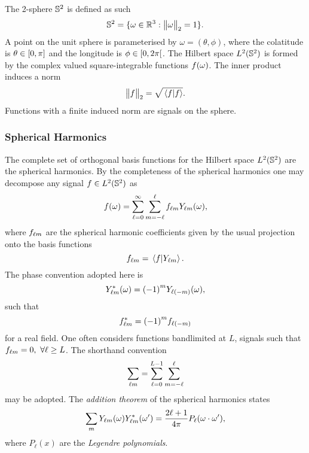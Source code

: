 The 2-sphere \(\twoSphere{}\) is defined as such
%
\begin{equation}
	\twoSphere{} = \set{\omega \in \mathbb{R}^{3} : \norm{\omega} = 1}.
\end{equation}
%
A point on the unit sphere is parameterised by \(\omega=(\theta,\phi)\), where the colatitude is \(\theta \in \interval{0}{\pi}\) and the longitude is \(\phi \in \interval[open right]{0}{2\pi}\).
The Hilbert space \(\hilbert{\twoSphere}\) is formed by the complex valued square-integrable functions \(\pixel{f}\).
The inner product induces a norm
%
\begin{equation}
	\norm{f} = \sqrt{\braket*{f}}.
\end{equation}
%
Functions with a finite induced norm are signals on the sphere.

\subsubsection{Spherical Harmonics}

The complete set of orthogonal basis functions for the Hilbert space \(\hilbert{\twoSphere}\) are the spherical harmonics.
By the completeness of the spherical harmonics one may decompose any signal \(f \in \hilbert{\twoSphere}\) as
%
\begin{equation}
	\pixel{f}
	= \sum\limits_{\ell=0}^{\infty} \sum\limits_{m=-\ell}^{\ell} \harmonic{f} \pixel{\harmonic{Y}},
\end{equation}
%
where \(\harmonic{f}\) are the spherical harmonic coefficients given by the usual projection onto the basis functions
%
\begin{equation}
	\harmonic{f}
	= \braket*{f}{\harmonic{Y}}.
\end{equation}
%
The phase convention adopted here is
%
\begin{equation}
	\pixel{\conj{\harmonic{Y}}}
	= {(-1)}^{m} \pixel{Y_{\ell(-m)}},
\end{equation}
%
such that
%
\begin{equation}
	\conj{\harmonic{f}}
	= {(-1)}^{m} f_{\ell(-m)}
\end{equation}
%
for a real field.
One often considers functions bandlimited at \(L\), \ie{} signals such that \(\harmonic{f} = 0,\ \forall \ell \geq L\).
The shorthand convention
%
\begin{equation}
	\harmonicSum
	= \sum\limits_{\ell=0}^{L-1} \sum\limits_{m=-\ell}^{\ell}
\end{equation}
%
may be adopted.
The \emph{addition theorem} of the spherical harmonics states
%
\begin{equation}\label{eq:chapter4_addition_theorem}
	\sum\limits_{m} \pixel{\harmonic{Y}} \pixel[']{\conj{\harmonic{Y}}}
	= \factor P_{\ell}(\omega \cdot \omega'),
\end{equation}
%
where \(P_{\ell}(x)\) are the \emph{Legendre polynomials}.

